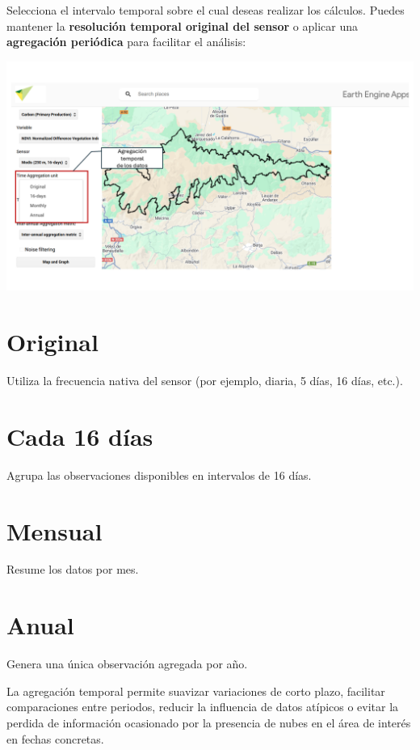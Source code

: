 \documentclass[
]{book}
\begin{document}
Selecciona el intervalo temporal sobre el cual deseas realizar los cálculos. Puedes mantener la \textbf{resolución temporal original del sensor} o aplicar una \textbf{agregación periódica} para facilitar el análisis:

\includegraphics{assets/aggregation_es.png}

\section{\texorpdfstring{\textbf{Original}}{Original}}\label{original}

Utiliza la frecuencia nativa del sensor (por ejemplo, diaria, 5 días, 16 días, etc.).

\section{\texorpdfstring{\textbf{Cada 16 días}}{Cada 16 días}}\label{cada-16-duxedas}

Agrupa las observaciones disponibles en intervalos de 16 días.

\section{\texorpdfstring{\textbf{Mensual}}{Mensual}}\label{mensual}

Resume los datos por mes.

\section{\texorpdfstring{\textbf{Anual}}{Anual}}\label{anual}

Genera una única observación agregada por año.

La agregación temporal permite suavizar variaciones de corto plazo, facilitar
comparaciones entre periodos, reducir la influencia de datos atípicos o evitar la
perdida de información ocasionado por la presencia de nubes en el área de interés en
fechas concretas.
\end{document}
